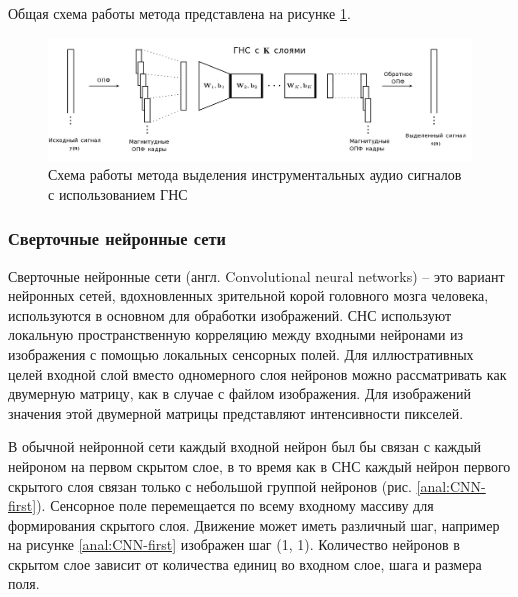 Общая схема работы метода представлена на рисунке \ref{anal:DNN-inst}.

\begin{figure}
	\centering
	\includegraphics[width=\textwidth]{inc/img/DNN-inst.png}
	\caption{Схема работы метода выделения инструментальных аудио сигналов с использованием ГНС}
	\label{anal:DNN-inst}
\end{figure}

\subsubsection{Сверточные нейронные сети}

Сверточные нейронные сети (англ. Convolutional neural networks) -- это вариант нейронных сетей, вдохновленных зрительной корой головного мозга человека\cite{Hubel}, используются в основном для обработки изображений. СНС используют локальную пространственную корреляцию между входными нейронами из изображения с помощью локальных сенсорных полей. Для иллюстративных целей входной слой вместо одномерного слоя нейронов можно рассматривать как двумерную матрицу, как в случае с файлом изображения. Для изображений значения этой двумерной матрицы представляют интенсивности пикселей. 

В обычной нейронной сети каждый входной нейрон был бы связан с каждый нейроном на первом скрытом слое, в то время как в СНС каждый нейрон первого скрытого слоя связан только с небольшой группой нейронов (рис. \ref{anal:CNN-first}). Сенсорное поле перемещается по всему входному массиву для формирования скрытого слоя. Движение может иметь различный шаг, например на рисунке \ref{anal:CNN-first} изображен шаг (1, 1). Количество нейронов в скрытом слое зависит от количества единиц во входном слое, шага и размера поля.


